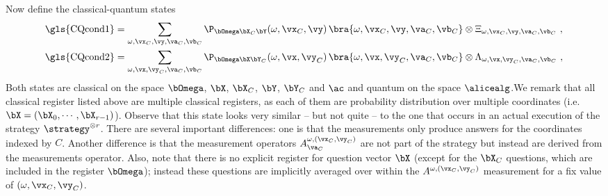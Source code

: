 Now define the classical-quantum states 
\begin{align}
	\label{eq:Xi-def} \text{\gls{CQcond1}} &= \sum_{\omega, \vx_C,\vy, \va_C, \vb_C} \P_{\bOmega \bX_C \bY} (\omega,\vx_C, \vy) \, \bra{\omega, \vx_C, \vy, \va_C, \vb_C}\otimes \Xi_{\omega,\vx_C, \vy,\va_C,\vb_C} ~,   \\
	\label{eq:Lambda-def} \text{\gls{CQcond2}} &= \sum_{\omega, \vx, \vy_C, \va_C, \vb_C} \P_{\bOmega \bX \bY_C} (\omega, \vx, \vy_C) \, \bra{\omega, \vx, \vy_C, \va_C, \vb_C} \otimes \Lambda_{\omega,\vx,\vy_C, \va_C,\vb_C}~,
\end{align}
Both states are classical on the space $\bOmega$, $\bX$, $\bX_C$, $\bY$, $\bY_C$ and $\ac$ and quantum on the space $\alicealg$.We remark that all classical register listed above are multiple classical registers, as each of them are probability distribution over multiple coordinates (i.e. $\bX = (\bX_0, \cdots, \bX_{r-1})$). Observe that this state looks very similar -- but not quite -- to the one that occurs in an actual execution of the strategy $\strategy^{\otimes r}$. There are several important differences: one is that the measurements only produce answers for the coordinates indexed by $C$. Another difference is that the measurement operators $A^{\omega, (\vx_C, \vy_C)}_{\va_C}$ are not part of the strategy but instead are derived from the measurements operator. Also, note that there is no explicit register for question vector $\bX$ (except for the $\bX_C$ questions, which are included in the register $\bOmega$); instead these questions are implicitly averaged over within the $A^{\omega, (\vx_C, \vy_C)}$ measurement for a fix value of $(\omega, \vx_C, \vy_C)$. 

